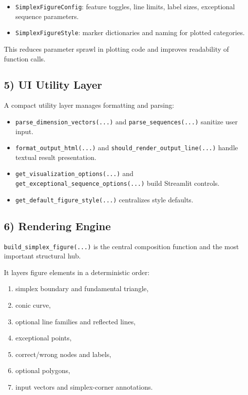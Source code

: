 \documentclass[11pt,a4paper]{article}
\begin{document}
\begin{itemize}
    \item \texttt{SimplexFigureConfig}: feature toggles, line limits, label sizes, exceptional sequence parameters.
    \item \texttt{SimplexFigureStyle}: marker dictionaries and naming for plotted categories.
\end{itemize}

This reduces parameter sprawl in plotting code and improves readability of function calls.

\subsection*{5) UI Utility Layer}
A compact utility layer manages formatting and parsing:

\begin{itemize}
    \item \texttt{parse\_dimension\_vectors(...)} and \texttt{parse\_sequences(...)} sanitize user input.
    \item \texttt{format\_output\_html(...)} and \texttt{should\_render\_output\_line(...)} handle textual result presentation.
    \item \texttt{get\_visualization\_options(...)} and \texttt{get\_exceptional\_sequence\_options(...)} build Streamlit controls.
    \item \texttt{get\_default\_figure\_style(...)} centralizes style defaults.
\end{itemize}

\subsection*{6) Rendering Engine}
\texttt{build\_simplex\_figure(...)} is the central composition function and the most important structural hub.

It layers figure elements in a deterministic order:
\begin{enumerate}
    \item simplex boundary and fundamental triangle,
    \item conic curve,
    \item optional line families and reflected lines,
    \item exceptional points,
    \item correct/wrong nodes and labels,
    \item optional polygons,
    \item input vectors and simplex-corner annotations.
\end{enumerate}
\end{document}

